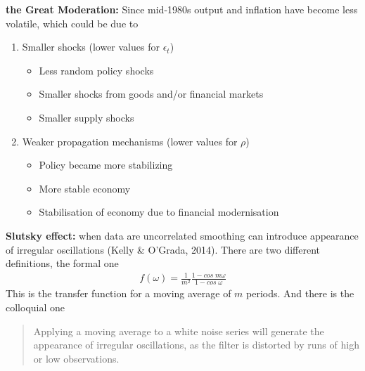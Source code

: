 \documentclass{beamer}
\begin{document}
\begin{frame}
  \textbf{the Great Moderation:} Since mid-1980s output and inflation have become less volatile, which could be due to
  \begin{enumerate}
  \item Smaller shocks (lower values for $\epsilon_t$)
  \begin{itemize}
    \item Less random policy shocks
    \item Smaller shocks from goods and/or financial markets
    \item Smaller supply shocks
  \end{itemize}
  \medskip
  \item Weaker propagation mechanisms (lower values for $\rho$)
  \begin{itemize}
    \item Policy became more stabilizing
    \item More stable economy
    \item Stabilisation of economy due to financial modernisation
  \end{itemize}
\end{enumerate}
\end{frame}

\begin{frame}
  \textbf{Slutsky effect:} when data are uncorrelated smoothing can introduce appearance of irregular oscillations (Kelly \& O'Grada, 2014).
  There are two different definitions, the formal one
  \begin{align}
     f(\omega)=\frac{1}{m^2} \frac{1-cos\;m\omega}{1-cos\;\omega}     
   \end{align} 
   \medskip
   This is the transfer function for a moving average of $m$ periods.
   And there is the colloquial one
   \begin{quote}
     Applying a moving average to a white noise series will generate the appearance of irregular oscillations, as the filter is distorted by runs of high or low observations.
   \end{quote}
\end{frame}
\end{document}
